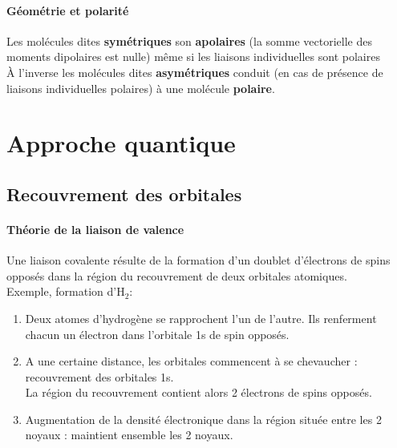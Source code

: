 \documentclass[10pt,a4paper]{book}
\begin{document}
\paragraph{Géométrie et polarité} Les molécules dites \textbf{symétriques} son \textbf{apolaires} (la somme vectorielle des moments dipolaires est nulle) même si les liaisons individuelles sont polaires \\
À l'inverse les molécules dites \textbf{asymétriques} conduit (en cas de présence de liaisons individuelles polaires) à une molécule \textbf{polaire}.

\section{Approche quantique}
\subsection{Recouvrement des orbitales}
\paragraph{Théorie de la liaison de valence} Une liaison covalente résulte de la formation d’un doublet d’électrons de spins opposés dans la région du recouvrement de deux orbitales atomiques. \\
Exemple, formation d'H$_2$:
\begin{enumerate}
\item Deux atomes d’hydrogène se rapprochent l’un de l’autre. Ils renferment chacun un électron dans l’orbitale 1s de spin opposés.
\item A une certaine distance, les orbitales commencent à se chevaucher : recouvrement des orbitales 1s. \\
La région du recouvrement contient alors 2 électrons de spins opposés.
\item Augmentation de la densité électronique dans la région située entre les 2 noyaux : maintient ensemble les 2 noyaux.
\end{enumerate}
\end{document}
